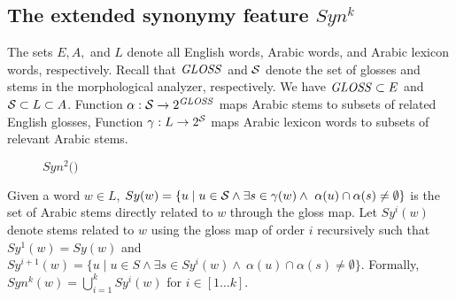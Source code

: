 
\subsection{The extended synonymy feature $Syn^k$}
\label{subsec:synk}

The sets $E, A,$ and $L$ denote all English words, Arabic words, 
and Arabic lexicon words, respectively.
Recall that $\mathit{GLOSS}$ and $\ss$ denote the set of glosses and stems in the morphological analyzer, respectively.
We have $\mathit{GLOSS} \subset E$ and $\ss \subset L \subset A$. 
Function $\alpha: \ss \rightarrow 2^{\GG}$ maps Arabic stems to 
subsets of related English glosses, %
Function $\gamma: L \rightarrow 2^{\ss}$ maps Arabic lexicon words to subsets 
of relevant Arabic stems. %

\begin{figure}[tb]
\begin{center}
\vspace{-3em}
\caption{$Syn^2($$)$}
\vspace{-2em}
\label{fig:introsynEx}
\end{center}
\end{figure}

Given a word $w\in L$, 
$Sy(w)=\{u\mid u\in \ss \land\exists s\in \gamma(w)\land~\alpha(u)\cap\alpha(s)\neq\emptyset\}$
is the set of Arabic stems 
directly related to $w$ through the gloss map.
%
Let $Sy^{i}(w)$ denote stems related to $w$ using the gloss map of order $i$ recursively such that
$Sy^{1}(w) = Sy(w)$ and
$Sy^{i+1}(w)=\{u\mid u\in S\land\exists s\in Sy^{i}(w)\land~\alpha(u)\cap\alpha(s)\neq\emptyset\}$.
Formally, $Syn^k(w) = \bigcup\limits_{i=1}^{k} Sy^{i}(w)$ for $i\in[1 \ldots k]$.
%

